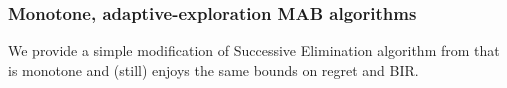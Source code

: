 \subsubsection{Monotone, adaptive-exploration MAB algorithms}
\label{app:MAB-monotone-smart}

We provide a simple modification of Successive Elimination algorithm from \citep{EvenDar-icml06} that is monotone and (still) enjoys the same bounds on regret and BIR.
%





